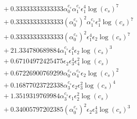 \documentclass[10pt]{article}
\begin{document}
\begin{align*}
&{}  + 0.33333333333333 \alpha_{0}^{c_s} \alpha_{1}^{c_s} \epsilon_{1}^{4} \log{\left(c_{s} \right)}^{7} \\
&{}  + 0.33333333333333 \left(\alpha_{0}^{c_s}\right)^{2} \alpha_{1}^{c_s} \epsilon_{1}^{3} \log{\left(c_{s} \right)}^{7} \\
&{}  + 0.33333333333333 \left(\alpha_{0}^{c_s}\right)^{2} \epsilon_{1}^{4} \epsilon_{2} \log{\left(c_{s} \right)}^{7} \\
&{}  + 21.334780689884 \alpha_{1}^{c_s} \epsilon_{1}^{4} \epsilon_{2} \log{\left(c_{s} \right)}^{3} \\
&{}  + 0.67104972425475 \epsilon_{2} \epsilon_{3}^{4} \epsilon_{4}^{2} \log{\left(c_{s} \right)} \\
&{}  + 0.67226900769299 \alpha_{0}^{c_s} \alpha_{4}^{c_s} \epsilon_{2} \log{\left(c_{s} \right)}^{2} \\
&{}  + 0.16877023722338 \alpha_{3}^{c_s} \epsilon_{2} \epsilon_{3}^{2} \log{\left(c_{s} \right)}^{4} \\
&{}  + 1.3519319769984 \alpha_{3}^{c_s} \epsilon_{1} \epsilon_{2}^{2} \log{\left(c_{s} \right)} \\
&{}  + 0.34005797202385 \left(\alpha_{0}^{c_s}\right)^{2} \epsilon_{2} \epsilon_{3}^{4} \log{\left(c_{s} \right)}^{3}
\end{align*}
\end{document}
